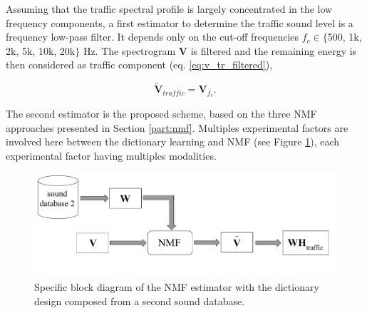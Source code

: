 \documentclass[twocolumn]{svjour3}          %
\begin{document}
Assuming that the traffic spectral profile is largely concentrated in the low frequency components, a first estimator to determine the traffic sound level is a frequency low-pass filter. It depends only on the cut-off frequencies $f_c \in  \lbrace$500, 1k, 2k, 5k, 10k, 20k$\rbrace$ Hz. The spectrogram $\mathbf{V}$ is filtered and the remaining energy is then considered as traffic component (eq. \ref{eq:v_tr_filtered}),

\begin{equation}\label{eq:v_tr_filtered}
\mathbf{\tilde{V}}_{traffic} = \mathbf{V}_{f_c}.
\end{equation}

The second estimator is the proposed scheme, based on the three NMF approaches presented in Section \ref{part:nmf}. Multiples experimental factors are involved here between the dictionary learning and NMF (see Figure \ref{fig:bloc_nmf}), each experimental factor having multiples modalities.

\begin{figure}
    \centering
    \includegraphics[width=\linewidth]{figures/bloc_diagram_NMF_EN_2.pdf}
    \caption{Specific block diagram of the NMF estimator with the dictionary design composed from a second sound database.}
    \label{fig:bloc_nmf}
\end{figure}
\end{document}
